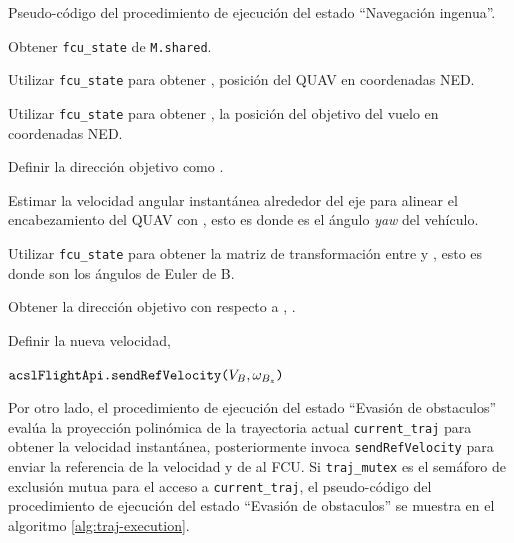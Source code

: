 \begin{algorithm}
\caption{Pseudo-código del procedimiento de ejecución del estado ``Navegación ingenua''. }
\label{alg:naive-execution}

Obtener \texttt{fcu\_state} de \texttt{M.shared}.

Utilizar \texttt{fcu\_state} para obtener , posición del QUAV en coordenadas NED.

Utilizar \texttt{fcu\_state} para obtener , la posición del objetivo del vuelo en coordenadas NED.

Definir la dirección objetivo como .

Estimar la velocidad angular instantánea alrededor del eje  para alinear el encabezamiento del QUAV con , esto es  donde \jim{\psi} es el ángulo \textit{yaw} del vehículo.

Utilizar \texttt{fcu\_state} para obtener la matriz de transformación entre  y , esto es  donde \jim{\phi,\theta,\psi} son los ángulos de Euler de B. 

Obtener la dirección objetivo con respecto a , .

Definir la nueva velocidad, 

$\text{\texttt{acslFlightApi.sendRefVelocity(}}V_{B}, \omega_{B_z}\text{\texttt{)}}$

\end{algorithm}

Por otro lado, el procedimiento de ejecución del estado ``Evasión de obstaculos'' evalúa la proyección polinómica de la trayectoria actual \texttt{current\_traj} para obtener la velocidad instantánea, posteriormente invoca \texttt{sendRefVelocity} para enviar la referencia de la velocidad y de  al FCU. Si \texttt{traj\_mutex} es el semáforo de exclusión mutua para el acceso a \texttt{current\_traj}, el pseudo-código del procedimiento de ejecución del estado ``Evasión de obstaculos'' se muestra en el algoritmo \ref{alg:traj-execution}.

